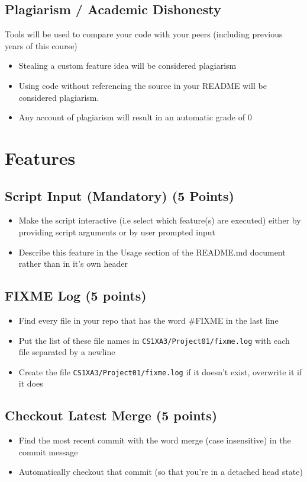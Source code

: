 \documentclass{article}
\begin{document}
\subsection{Plagiarism / Academic Dishonesty}
\label{sec:org50347ca}
Tools will be used to compare your code with your peers (including previous
years of this course) 
\begin{itemize}
\item Stealing a custom feature idea will be considered plagiarism
\item Using code without referencing the source in your README will be considered
plagiarism.
\item Any account of plagiarism will result in an automatic grade of 0
\end{itemize}

\newpage

\section{Features}
\label{sec:org5b66760}
\subsection{Script Input (\textbf{Mandatory}) (5 Points)}
\label{sec:orga415165}
\begin{itemize}
\item Make the script interactive (i.e select which feature(s) are executed)
either by providing script arguments or by user prompted input
\item Describe this feature in the {\color{purple}Usage} section of the {\color{purple}README.md} document
rather than in it's own header
\end{itemize}
\subsection{FIXME Log (5 points)}
\label{sec:org5b52355}
\begin{itemize}
\item Find every file in your repo that has the word {\color{purple}\#FIXME} in the last line
\item Put the list of these file names in  \texttt{CS1XA3/Project01/fixme.log} with each file separated by a newline
\item Create the file \texttt{CS1XA3/Project01/fixme.log} if it doesn't exist, overwrite
it if it does
\end{itemize}
\subsection{Checkout Latest Merge (5 points)}
\label{sec:orgcde88c8}
\begin{itemize}
\item Find the most recent commit with the word {\color{purple}merge} (case
insensitive) in the commit message
\item Automatically checkout that commit (so that you're in a detached head
state)
\end{itemize}
\end{document}
